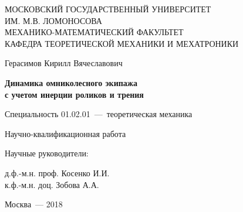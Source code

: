 \thispagestyle{empty}%
\begin{center}%
\MakeUppercase{Московский государственный университет}\\
\MakeUppercase{им. М.В. Ломоносова}\\
\MakeUppercase{механико-математический факультет}\\
\MakeUppercase{кафедра теоретической механики и мехатроники}
\end{center}%
%
\vspace{0pt plus4fill} %
\begin{flushright}%


\end{flushright}%
%
\vspace{0pt plus6fill} %
\begin{center}%
{\large Герасимов Кирилл Вячеславович}
\end{center}%
%
\vspace{0pt plus1fill} %
\begin{center}%
\textbf {\large Динамика омниколесного экипажа \\ с учетом инерции роликов и трения}

\vspace{0pt plus2fill} %
{%
Специальность 01.02.01~---~теоретическая механика
}

\vspace{0pt plus2fill} %
Научно-квалификационная работа

\end{center}%
%
\vspace{0pt plus4fill} %
\begin{flushright}%
Научные руководители:

д.ф.-м.н. проф. Косенко И.И.\\
к.ф.-м.н. доц. Зобова А.А.

\end{flushright}%
%
\vspace{0pt plus4fill} %
\begin{center}%
{Москва~--- 2018}
\end{center}%
\newpage
